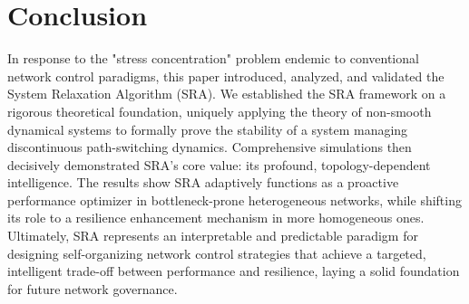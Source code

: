 \documentclass[journal]{IEEEtran}
\begin{document}
\section{Conclusion}
\label{sec:conclusion}

In response to the "stress concentration" problem endemic to conventional network control paradigms, this paper introduced, analyzed, and validated the System Relaxation Algorithm (SRA). We established the SRA framework on a rigorous theoretical foundation, uniquely applying the theory of non-smooth dynamical systems to formally prove the stability of a system managing discontinuous path-switching dynamics. Comprehensive simulations then decisively demonstrated SRA's core value: its profound, topology-dependent intelligence. The results show SRA adaptively functions as a proactive performance optimizer in bottleneck-prone heterogeneous networks, while shifting its role to a resilience enhancement mechanism in more homogeneous ones. Ultimately, SRA represents an interpretable and predictable paradigm for designing self-organizing network control strategies that achieve a targeted, intelligent trade-off between performance and resilience, laying a solid foundation for future network governance.







\appendices
\end{document}

